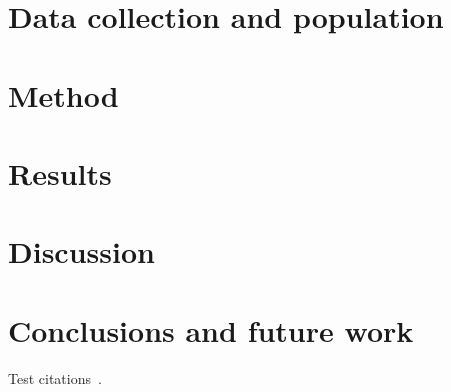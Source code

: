 \documentclass[conference]{IEEEtran}
\begin{document}
\section{Data collection and population}

\section{Method}

\section{Results}

\section{Discussion}

\section{Conclusions and future work}


Test citations~\cite{crick-et-al:fie2019,itnowcyber:2019,crick-et-al-accred:cep2020,itnowaccred:2020,crick-et-al:iticse2020,irons-et-alposter:sigcse2021}.




%

\end{document}

